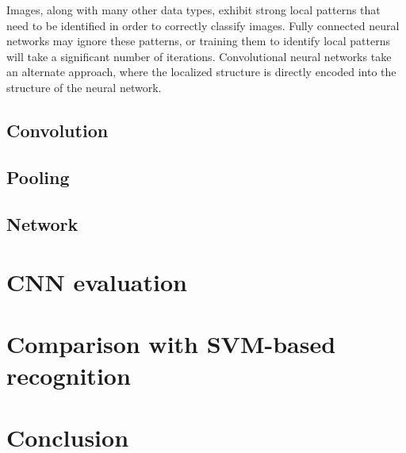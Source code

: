 \documentclass[10pt,twocolumn]{article}
\begin{document}
Images, along with many other data types, exhibit strong local patterns that need to be identified in order to correctly classify images. Fully connected neural networks may ignore these patterns, or training them to identify local patterns will take a significant number of iterations. Convolutional neural networks take an alternate approach, where the localized structure is directly encoded into the structure of the neural network.

\subsection{Convolution}

\subsection{Pooling}

\subsection{Network}

\section{CNN evaluation} \label{sec:evalcnn}

\section{Comparison with SVM-based recognition} \label{sec:evalfeature}

\section{Conclusion}
\end{document}
